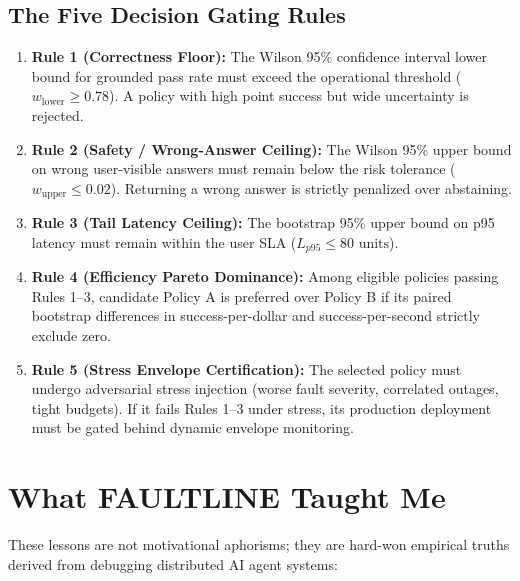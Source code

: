 \subsection{The Five Decision Gating Rules}
\begin{enumerate}
    \item \textbf{Rule 1 (Correctness Floor):} The Wilson 95\% confidence interval lower bound for grounded pass rate must exceed the operational threshold ($w_{\text{lower}} \ge 0.78$). A policy with high point success but wide uncertainty is rejected.
    \item \textbf{Rule 2 (Safety / Wrong-Answer Ceiling):} The Wilson 95\% upper bound on wrong user-visible answers must remain below the risk tolerance ($w_{\text{upper}} \le 0.02$). Returning a wrong answer is strictly penalized over abstaining.
    \item \textbf{Rule 3 (Tail Latency Ceiling):} The bootstrap 95\% upper bound on p95 latency must remain within the user SLA ($L_{p95} \le 80\text{ units}$).
    \item \textbf{Rule 4 (Efficiency Pareto Dominance):} Among eligible policies passing Rules 1--3, candidate Policy A is preferred over Policy B if its paired bootstrap differences in success-per-dollar and success-per-second strictly exclude zero.
    \item \textbf{Rule 5 (Stress Envelope Certification):} The selected policy must undergo adversarial stress injection (worse fault severity, correlated outages, tight budgets). If it fails Rules 1--3 under stress, its production deployment must be gated behind dynamic envelope monitoring.
\end{enumerate}

\vspace{12pt}
\section{What FAULTLINE Taught Me}

These lessons are not motivational aphorisms; they are hard-won empirical truths derived from debugging distributed AI agent systems:

